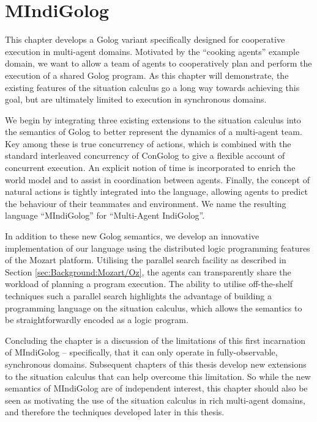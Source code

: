 

\chapter{MIndiGolog}

\label{ch:mindigolog}

This chapter develops a Golog variant specifically designed for cooperative
execution in multi-agent domains. Motivated by the {}``cooking agents''
example domain, we want to allow a team of agents to cooperatively
plan and perform the execution of a shared Golog program. As this
chapter will demonstrate, the existing features of the situation calculus
go a long way towards achieving this goal, but are ultimately limited
to execution in synchronous domains.

We begin by integrating three existing extensions to the situation
calculus into the semantics of Golog to better represent the dynamics
of a multi-agent team. Key among these is true concurrency of actions,
which is combined with the standard interleaved concurrency of ConGolog
to give a flexible account of concurrent execution. An explicit notion
of time is incorporated to enrich the world model and to assist in
coordination between agents. Finally, the concept of natural actions
is tightly integrated into the language, allowing agents to predict
the behaviour of their teammates and environment. We name the resulting
language {}``MIndiGolog'' for {}``Multi-Agent IndiGolog''.

In addition to these new Golog semantics, we develop an innovative
implementation of our language using the distributed logic programming
features of the Mozart platform. Utilising the parallel search facility
as described in Section \ref{sec:Background:Mozart/Oz}, the agents
can transparently share the workload of planning a program execution.
The ability to utilise off-the-shelf techniques such a parallel search
highlights the advantage of building a programming language on the
situation calculus, which allows the semantics to be straightforwardly
encoded as a logic program.

Concluding the chapter is a discussion of the limitations of this
first incarnation of MIndiGolog -- specifically, that it can only
operate in fully-observable, synchronous domains. Subsequent chapters
of this thesis develop new extensions to the situation calculus that
can help overcome this limitation. So while the new semantics of MIndiGolog
are of independent interest, this chapter should also be seen as motivating
the use of the situation calculus in rich multi-agent domains, and
therefore the techniques developed later in this thesis.

